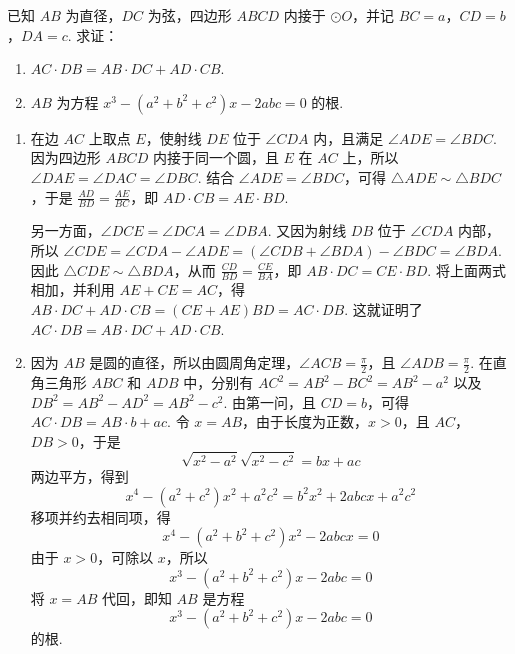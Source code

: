 \begin{problem}
已知 \(AB\) 为直径，\(DC\) 为弦，四边形 \(ABCD\) 内接于 \(\odot O\)，并记 \(BC=a\)，\(CD=b\)，\(DA=c\). 求证：

\begin{enumerate}
\item \(AC\cdot DB=AB\cdot DC+AD\cdot CB\).

\item \(AB\) 为方程 \(x^{3}-\left(a^{2}+b^{2}+c^{2}\right)x-2abc=0\) 的根.
\end{enumerate}
\end{problem}

\begin{solution}

\begin{enumerate}
\item
在边 \(AC\) 上取点 \(E\)，使射线 \(DE\) 位于 \(\angle CDA\) 内，且满足 \(\angle ADE=\angle BDC\). 因为四边形 \(ABCD\) 内接于同一个圆，且 \(E\) 在 \(AC\) 上，所以 \(\angle DAE=\angle DAC=\angle DBC\). 结合 \(\angle ADE=\angle BDC\)，可得 \(\triangle ADE\sim\triangle BDC\)，于是 \(\frac{AD}{BD}=\frac{AE}{BC}\)，即 \(AD\cdot CB=AE\cdot BD\).

另一方面，\(\angle DCE=\angle DCA=\angle DBA\). 又因为射线 \(DB\) 位于 \(\angle CDA\) 内部，所以 \(\angle CDE=\angle CDA-\angle ADE=\left(\angle CDB+\angle BDA\right)-\angle BDC=\angle BDA\). 因此 \(\triangle CDE\sim\triangle BDA\)，从而 \(\frac{CD}{BD}=\frac{CE}{BA}\)，即 \(AB\cdot DC=CE\cdot BD\). 将上面两式相加，并利用 \(AE+CE=AC\)，得 \(AB\cdot DC+AD\cdot CB=\left(CE+AE\right)BD=AC\cdot DB\). 这就证明了 \(AC\cdot DB=AB\cdot DC+AD\cdot CB\).

\item
因为 \(AB\) 是圆的直径，所以由圆周角定理，\(\angle ACB=\frac{\pi}{2}\)，且 \(\angle ADB=\frac{\pi}{2}\). 在直角三角形 \(ABC\) 和 \(ADB\) 中，分别有 \(AC^{2}=AB^{2}-BC^{2}=AB^{2}-a^{2}\) 以及 \(DB^{2}=AB^{2}-AD^{2}=AB^{2}-c^{2}\). 由第一问，且 \(CD=b\)，可得 \(AC\cdot DB=AB\cdot b+ac\).
令 \(x=AB\)，由于长度为正数，\(x>0\)，且 \(AC\)，\(DB>0\)，于是
\[
\sqrt{x^{2}-a^{2}}\sqrt{x^{2}-c^{2}}=bx+ac
\]
两边平方，得到
\[
x^{4}-\left(a^{2}+c^{2}\right)x^{2}+a^{2}c^{2}
=b^{2}x^{2}+2abcx+a^{2}c^{2}
\]
移项并约去相同项，得
\[
x^{4}-\left(a^{2}+b^{2}+c^{2}\right)x^{2}-2abcx=0
\]
由于 \(x>0\)，可除以 \(x\)，所以
\[
x^{3}-\left(a^{2}+b^{2}+c^{2}\right)x-2abc=0
\]
将 \(x=AB\) 代回，即知 \(AB\) 是方程
\[
x^{3}-\left(a^{2}+b^{2}+c^{2}\right)x-2abc=0
\]
的根.
\end{enumerate}
\end{solution}
